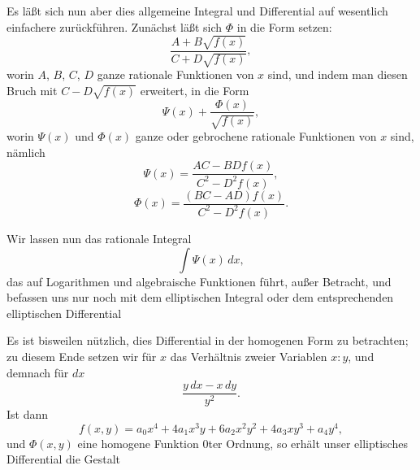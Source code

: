  Es läßt sich nun aber dies allgemeine Integral und Differential auf wesentlich einfachere zurückführen. Zunächst läßt sich $\Phi$ in die Form setzen:
\[
\frac{A + B\sqrt{f(x)}}{C + D\sqrt{f(x)}},
\]
worin $A$, $B$, $C$, $D$ ganze rationale Funktionen von $x$ sind, und indem man diesen Bruch mit $C - D\sqrt{f(x)}$ erweitert, in die Form
\[
\Psi(x) + \frac{\Phi(x)}{\sqrt{f(x)}},
\]
worin $\Psi(x)$ und $\Phi(x)$ ganze oder gebrochene rationale Funktionen von $x$ sind, nämlich
\[
\Psi(x) = \frac{AC - BDf(x)}{C^2 - D^2f(x)},
\]
\[
\Phi(x) = \frac{(BC - AD)f(x)}{C^2 - D^2f(x)}.
\]

Wir lassen nun das rationale Integral
\[
\int \Psi(x)\, dx,
\]
das auf Logarithmen und algebraische Funktionen führt, außer Betracht, und befassen uns nur noch mit dem elliptischen Integral
oder dem entsprechenden elliptischen Differential

Es ist bisweilen nützlich, dies Differential in der homogenen Form zu betrachten; zu diesem Ende setzen wir für $x$ das Verhältnis zweier Variablen $x:y$, und demnach für $dx$
\[
\frac{y\, dx - x\, dy}{y^2}.
\]
Ist dann
\[
f(x, y) = a_0 x^4 + 4 a_1 x^3 y + 6 a_2 x^2 y^2 + 4 a_3 x y^3 + a_4 y^4,
\]
und $\Phi(x, y)$ eine homogene Funktion 0ter Ordnung, so erhält unser elliptisches Differential die Gestalt
